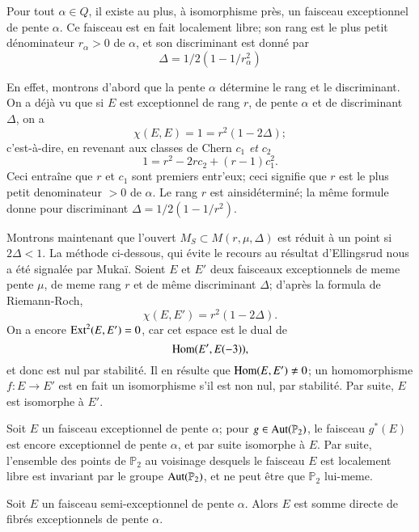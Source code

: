 \begin{proposition}\label{chap5-prop2}
Pour tout $\alpha\in Q$, il existe au plus, \`a isomorphisme pr\`es,
un faisceau exceptionnel de pente $\alpha$. Ce faisceau est en fait
localement libre; son rang est le plus petit d\'enominateur
$r_{\alpha}>0$ de $\alpha$, et son discriminant est donn\'e par
$$
\Delta=1/2(1-1/r^{2}_{\alpha})
$$
\end{proposition}

En effet, montrons d'abord que la pente $\alpha$ d\'etermine le rang
et le discriminant. On a d\'ej\`a vu que si $E$ est exceptionnel de
rang $r$, de pente $\alpha$ et de discriminant $\Delta$, on a
$$
\chi(E,E)=1=r^{2}(1-2\Delta);
$$
c'est-\`a-dire, en revenant aux classes de Chern $c_{1}$ {\em et}
$c_{2}$
$$
1=r^{2}-2rc_{2}+(r-1)c^{2}_{1}.
$$
Ceci entra\^ine que $r$ et $c_{1}$ sont premiers entr'eux; ceci
signifie que $r$ est le plus petit denominateur $>0$ de $\alpha$. Le
rang $r$ est ainsi\pageoriginale d\'etermin\'e; la m\^eme formule
donne pour discriminant $\Delta=1/2(1-1/r^{2})$. 

Montrons maintenant que l'ouvert $M_{S}\subset M(r,\mu,\Delta)$ est
r\'eduit \`a un point si $2\Delta <1$. La m\'ethode ci-dessous,
qui \'evite le recours au r\'esultat d'Ellingsrud \cite{chap5-key6}
nous a \'et\'e signal\'ee par Muka\"i. Soient $E$ et $E'$ deux
faisceaux exceptionnels de meme pente $\mu$, de meme rang $r$ et de
m\^eme discriminant $\Delta$; d'apr\`es la formula de Riemann-Roch,
$$
\chi(E,E')=r^{2}(1-2\Delta).
$$
On a encore $\operatorname{Ext}^{2}(E,E')=0$, car cet espace est le dual de
$$
\operatorname{Hom}(E',E(-3)),
$$ 
et donc est nul par stabilit\'e. Il en r\'esulte que
$\operatorname{Hom}(E,E')\neq 0$; un homomorphisme $f:E\to E'$ est en fait un
isomorphisme s'il est non nul, par stabilit\'e. Par suite, $E$ est
isomorphe \`a $E'$. 

Soit $E$ un faisceau exceptionnel de pente $\alpha$; pour $g\in \operatorname{Aut}
(\mathbb{P}_{2})$, le faisceau $g^{*}(E)$ est encore exceptionnel de
pente $\alpha$, et par suite isomorphe \`a $E$. Par suite, l'ensemble
des points de $\mathbb{P}_{2}$ au voisinage desquels le faisceau $E$
est localement libre est invariant par le groupe
$\operatorname{Aut}(\mathbb{P}_{2})$, et ne peut \^etre que $\mathbb{P}_{2}$
lui-meme.

\begin{proposition}\label{chap5-prop3}
Soit $E$ un faisceau semi-exceptionnel de pente $\alpha$. Alors $E$
est somme directe de fibr\'es exceptionnels de pente $\alpha$.
\end{proposition}

